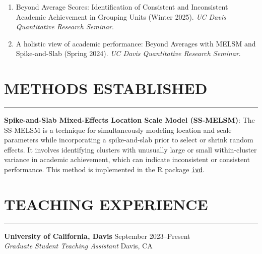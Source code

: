 \documentclass[10pt,]{article}
\begin{document}
\begin{enumerate}
\def\labelenumi{\arabic{enumi}.}
\item
  Beyond Average Scores: Identification of Consistent and Inconsistent
  Academic Achievement in Grouping Units (Winter 2025). \emph{UC Davis
  Quantitative Research Seminar}.
\item
  A holistic view of academic performance: Beyond Averages with MELSM
  and Spike-and-Slab (Spring 2024). \emph{UC Davis Quantitative Research
  Seminar}.
\end{enumerate}

\section{METHODS ESTABLISHED}\label{methods-established}

\hrule

\textbf{Spike-and-Slab Mixed-Effects Location Scale Model (SS-MELSM)}:
The SS-MELSM is a technique for simultaneously modeling location and
scale parameters while incorporating a spike-and-slab prior to select or
shrink random effects. It involves identifying clusters with unusually
large or small within-cluster variance in academic achievement, which
can indicate inconsistent or consistent performance. This method is
implemented in the R package
\href{https://github.com/consistentlyBetter/ivd}{\texttt{ivd}}.

\section{TEACHING EXPERIENCE}\label{teaching-experience}

\hrule

\textbf{University of California, Davis} \hfill September
2023--Present\\
\emph{Graduate Student Teaching Assistant} \hfill Davis, CA
\end{document}

